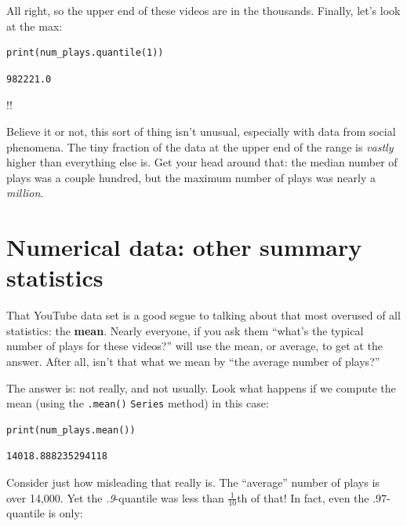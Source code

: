 All right, so the upper end of these videos are in the thousands. Finally,
let's look at the max:

\begin{Verbatim}[fontsize=\small,samepage=true,frame=single,framesep=3mm]
print(num_plays.quantile(1))
\end{Verbatim}
\vspace{-.3in}

\begin{Verbatim}[fontsize=\small,samepage=true,frame=leftline,framesep=5mm,framerule=1mm]
982221.0
\end{Verbatim}

!!

Believe it or not, this sort of thing isn't unusual, especially with data from
social phenomena. The tiny fraction of the data at the upper end of the range
is \textit{vastly} higher than everything else is. Get your head around that:
the median number of plays was a couple hundred, but the maximum number of
plays was nearly a \textit{million}.

\section{Numerical data: other summary statistics}


That YouTube data set is a good segue to talking about that most overused of
all statistics: the \textbf{mean}. Nearly everyone, if you ask them ``what's
the typical number of plays for these videos?'' will use the mean, or average,
to get at the answer. After all, isn't that what we mean by ``the average
number of plays?''

The answer is: not really, and not usually. Look what happens if we compute the
mean (using the \texttt{.mean()} \texttt{Series} method) in this case:

\begin{Verbatim}[fontsize=\small,samepage=true,frame=single,framesep=3mm]
print(num_plays.mean())
\end{Verbatim}
\vspace{-.3in}

\begin{Verbatim}[fontsize=\small,samepage=true,frame=leftline,framesep=5mm,framerule=1mm]
14018.888235294118
\end{Verbatim}

Consider just how misleading that really is. The ``average'' number of plays is
over 14,000. Yet the \textit{.9}-quantile was less than $\frac{1}{10}$th of that!
In fact, even the .97-quantile is only:

